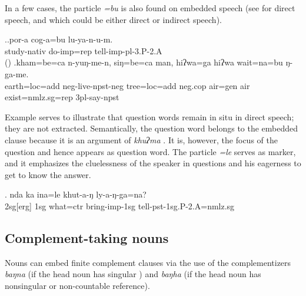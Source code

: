 In a few cases, the  particle \emph{=bu} is also found on embedded speech (see \Next[a] for direct speech, and \Next[b] which could be either direct or indirect speech). 

\ex.\ag.por-a        cog-a=bu         lu-ya-n-u-m.\\
study{\sc -nativ} do{\sc -imp=rep} tell{\sc -imp-pl-3.P-2.A}\\
 () 
\bg.kham=be=ca   n-yuŋ-me-n,  siŋ=be=ca   man,     hiʔwa=ga    hiʔwa wait=na=bu    ŋ-ga-me.\\
earth{\sc =loc=add} {\sc neg-}live{\sc [3sg]-npst-neg} tree{\sc =loc=add} {\sc neg.cop} air{\sc =gen} air exist{\sc [npst;3]=nmlz.sg=rep} {\sc 3pl-}say{\sc -npst}\\

\largerpage
Example \Next serves to illustrate that question words remain in situ in direct speech; they are not extracted. Semantically, the question word belongs to the embedded clause because it is an argument of \emph{khuʔma} . It is, however, the focus of the question and hence appears as question word. The particle \emph{=le} serves as  marker, and it emphasizes the cluelessness of the speaker  in questions and his eagerness to get to know the answer.

\exg. nda ka ina=le khut-a-ŋ ly-a-ŋ-ga=na?\\
		{\sc 2sg[erg]} {\sc 1sg} what{\sc =ctr}	bring{\sc -imp-1sg} tell{\sc -pst-1sg.P-2.A=nmlz.sg}\\







\subsection{Complement-taking nouns}\label{noun-compl}

Nouns can embed finite complement clauses via the use of the complementizers \emph{baŋna} (if the head noun has singular ) and \emph{baŋha} (if the head noun has nonsingular  or non-countable reference). 


